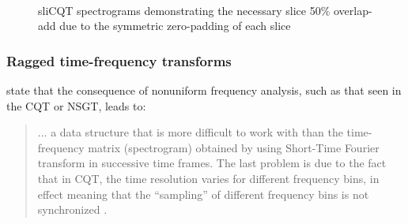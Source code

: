 \documentclass[report.tex]{subfiles}
\begin{document}
\begin{figure}[ht]
	\centering
	\\
	\caption{sliCQT spectrograms demonstrating the necessary slice 50\% overlap-add due to the symmetric zero-padding of each slice}
	\label{fig:slicqoverlaps}
\end{figure}

\subsubsection{Ragged time-frequency transforms}
\label{sec:raggedtf}

\citeauthor{klapuricqt} state that the consequence of nonuniform frequency analysis, such as that seen in the CQT or NSGT, leads to:
\begin{quote}
	... a data structure that is more difficult to work with than the time-frequency matrix (spectrogram) obtained by using Short-Time Fourier transform in successive time frames. The last problem is due to the fact that in CQT, the time resolution varies for different frequency bins, in effect meaning that the ``sampling'' of different frequency bins is not synchronized \parencite[1]{klapuricqt}.
\end{quote}
\end{document}

